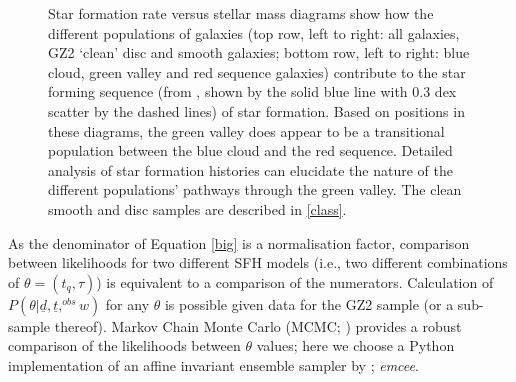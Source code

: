 \documentclass[useAMS,usenatbib]{mn2e}
\begin{document}
\begin{figure}
\caption{Star formation rate versus stellar mass diagrams show how the different populations of galaxies  (top row, left to right: all galaxies, GZ2 `clean' disc and smooth galaxies; bottom row, left to right: blue cloud, green valley and red sequence galaxies) contribute to the star forming sequence (from \citet{Peng}, shown by the solid blue line with 0.3 dex scatter by the dashed lines) of star formation. Based on positions in these diagrams, the green valley does appear to be a transitional population between the blue cloud and the red sequence. Detailed analysis of star formation histories can elucidate the nature of the different populations' pathways through the green valley. The clean smooth and disc samples are described in \ref{class}.}
\label{sfr_mass_sub}
\end{figure}

As the denominator of Equation \ref{big} is a normalisation factor, comparison between likelihoods for two different SFH models (i.e., two different combinations of $\theta = (t_q, \tau)$) is equivalent to a comparison of the numerators. Calculation of $P(\theta|\underline{d}, \underline{t},^{obs} w)$  for any $\theta$ is possible given data for the GZ2 sample (or a sub-sample thereof). Markov Chain Monte Carlo (MCMC; \citealt{MacKay, Dan, GW10}) provides a robust comparison of the likelihoods between $\theta$ values; here we choose a Python implementation of an affine invariant ensemble sampler by \cite{Dan}; \emph{emcee}.
\end{document}
